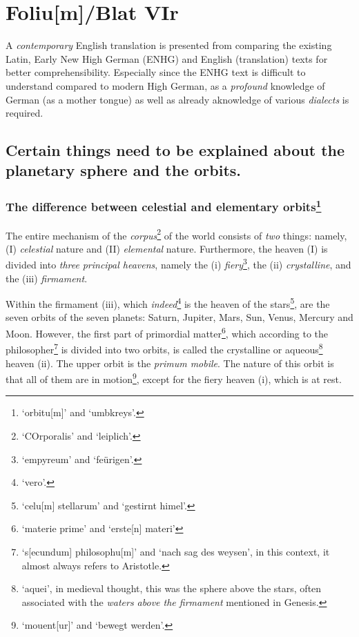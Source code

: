 \documentclass[
]{article}
\author{Dietmar Gerald Schrausser}
\date{09.05.2026}
\begin{document}
\hypertarget{foliumblat-vir}{%
\section{Foliu{[}m{]}/Blat VIr}\label{foliumblat-vir}}

A \emph{contemporary} English translation is presented from comparing
the existing Latin, Early New High German (ENHG) and English
(translation) texts for better comprehensibility. Especially since the
ENHG text is difficult to understand compared to modern High German, as
a \emph{profound} knowledge of German (as a mother tongue) as well as
already aknowledge of various \emph{dialects} is required.

\hypertarget{certain-things-need-to-be-explained-about-the-planetary-sphere-and-the-orbits.}{%
\subsection{Certain things need to be explained about the planetary
sphere and the
orbits.}\label{certain-things-need-to-be-explained-about-the-planetary-sphere-and-the-orbits.}}

\hypertarget{the-difference-between-celestial-and-elementary-orbits1}{%
\subsubsection[The difference between celestial and elementary
orbits]{\texorpdfstring{The difference between celestial and elementary
orbits\footnote{`orbitu{[}m{]}' and `umbkreys'.}}{The difference between celestial and elementary orbits}}\label{the-difference-between-celestial-and-elementary-orbits1}}

The entire mechanism of the \emph{corpus}\footnote{`COrporalis' and
  `leiplich'.} of the world consists of \emph{two} things: namely, (I)
\emph{celestial} nature and (II) \emph{elemental} nature. Furthermore,
the heaven (I) is divided into \emph{three} \emph{principal heavens},
namely the (i) \emph{fiery}\footnote{`empyreum' and `feürigen'.}, the
(ii) \emph{crystalline}, and the (iii) \emph{firmament}.

Within the firmament (iii), which \emph{indeed}\footnote{`vero'.} is the
heaven of the stars\footnote{`celu{[}m{]} stellarum' and `gestirnt
  himel'.}, are the seven orbits of the seven planets: Saturn, Jupiter,
Mars, Sun, Venus, Mercury and Moon. However, the first part of
primordial matter\footnote{`materie prime' and `erste{[}n{]} materi'},
which according to the philosopher\footnote{`s{[}ecundum{]}
  philosophu{[}m{]}' and `nach sag des weysen', in this context, it
  almost always refers to Aristotle.} is divided into two orbits, is
called the crystalline or aqueous\footnote{`aquei', in medieval thought,
  this was the sphere above the stars, often associated with the
  \emph{waters above the firmament} mentioned in Genesis.} heaven (ii).
The upper orbit is the \emph{primum mobile}. The nature of this orbit is
that all of them are in motion\footnote{`mouent{[}ur{]}' and `bewegt
  werden'.}, except for the fiery heaven (i), which is at rest.
\end{document}
